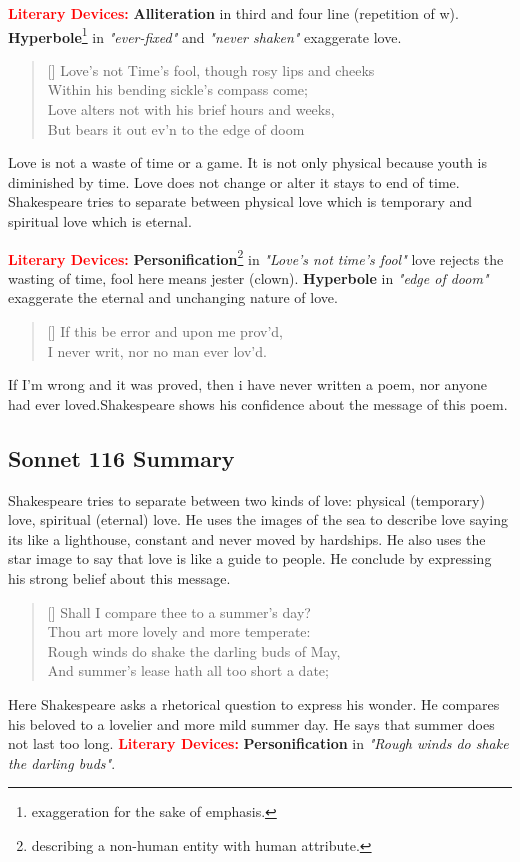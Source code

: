 \documentclass[12pt, a4paper]{article}
\begin{document}
{\textbf{\textcolor{red}{Literary Devices:}} \textbf{Alliteration} in third and
four line (repetition of w). \textbf{Hyperbole}\footnote{exaggeration for the sake of emphasis.}
in \textit{"ever-fixed"} and \textit{"never shaken"} 
exaggerate love.

\begin{verse}[\versewidth]
{\fontverse
Love's not Time's fool, though rosy lips and cheeks\\
Within his bending sickle's compass come; \\
Love alters not with his brief hours and weeks,\\
But bears it out ev'n to the edge of doom
}
\end{verse}
Love is not a waste of time or a game. It is not only physical
because youth is diminished by time. Love does not change or alter
it stays to end of time. Shakespeare tries to separate between physical
love which is temporary and spiritual love which is eternal.\smallbreak

\textbf{\textcolor{red}{Literary Devices:}} \textbf{Personification}\footnote{
describing a non-human entity with human attribute.} 
in \textit{"Love's not time's fool"} love rejects the wasting of time, fool here means 
jester (clown). \textbf{Hyperbole} in \textit{"edge of doom"} 
exaggerate the eternal and unchanging nature of love.

\begin{verse}[\versewidth]
{\fontverse
If this be error and upon me prov'd,\\
I never writ, nor no man ever lov'd.
}
\end{verse}
If I'm wrong and it was proved, then i have 
never written a poem, nor anyone had ever loved.Shakespeare shows his 
confidence about the message of this poem.

\subsection*{Sonnet 116 Summary}
Shakespeare tries to separate between two kinds of love:
physical (temporary) love, spiritual
(eternal) love. He uses the images of the sea to describe love
saying its like a lighthouse, constant and never moved by hardships.
He also uses the star image to say that love is like a guide to people.
He conclude by expressing his strong belief about this message.

\settowidth{\versewidth}{Shall I compare thee to a summer’s day?}
\begin{verse}[\versewidth]
{\fontverse
Shall I compare thee to a summer’s day?\\
Thou art more lovely and more temperate: \\
Rough winds do shake the darling buds of May, \\
And summer’s lease hath all too short a date; 
}
\end{verse}
Here Shakespeare asks a rhetorical question to 
express his wonder. He compares his beloved to a lovelier and
more mild summer day. He says that summer does not last too long.\smallbreak
\textbf{\textcolor{red}{Literary Devices:}} \textbf{Personification} in \textit{"Rough winds do shake the darling buds"}.


}
\end{document}
